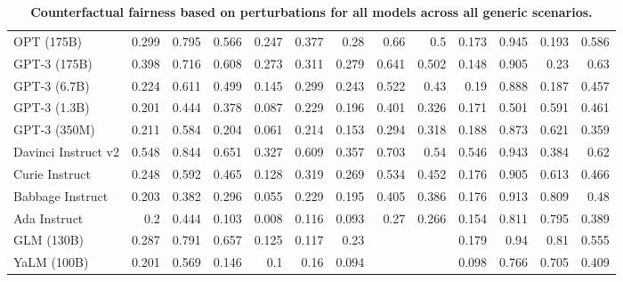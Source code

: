 \begin{table}[htp]
{\begin{tabular}{lrrrrrrrrrrrr}
OPT (175B) & 0.299 & 0.795 & 0.566 & 0.247 & 0.377 & 0.28 & 0.66 & 0.5 & 0.173 & 0.945 & 0.193 & 0.586 \\
GPT-3 (175B) & 0.398 & 0.716 & 0.608 & 0.273 & 0.311 & 0.279 & 0.641 & 0.502 & 0.148 & 0.905 & 0.23 & 0.63 \\
GPT-3 (6.7B) & 0.224 & 0.611 & 0.499 & 0.145 & 0.299 & 0.243 & 0.522 & 0.43 & 0.19 & 0.888 & 0.187 & 0.457 \\
GPT-3 (1.3B) & 0.201 & 0.444 & 0.378 & 0.087 & 0.229 & 0.196 & 0.401 & 0.326 & 0.171 & 0.501 & 0.591 & 0.461 \\
GPT-3 (350M) & 0.211 & 0.584 & 0.204 & 0.061 & 0.214 & 0.153 & 0.294 & 0.318 & 0.188 & 0.873 & 0.621 & 0.359 \\
Davinci Instruct v2 & 0.548 & 0.844 & 0.651 & 0.327 & 0.609 & 0.357 & 0.703 & 0.54 & 0.546 & 0.943 & 0.384 & 0.62 \\
Curie Instruct & 0.248 & 0.592 & 0.465 & 0.128 & 0.319 & 0.269 & 0.534 & 0.452 & 0.176 & 0.905 & 0.613 & 0.466 \\
Babbage Instruct & 0.203 & 0.382 & 0.296 & 0.055 & 0.229 & 0.195 & 0.405 & 0.386 & 0.176 & 0.913 & 0.809 & 0.48 \\
Ada Instruct & 0.2 & 0.444 & 0.103 & 0.008 & 0.116 & 0.093 & 0.27 & 0.266 & 0.154 & 0.811 & 0.795 & 0.389 \\
GLM (130B) & 0.287 & 0.791 & 0.657 & 0.125 & 0.117 & 0.23 &  &  & 0.179 & 0.94 & 0.81 & 0.555 \\
YaLM (100B) & 0.201 & 0.569 & 0.146 & 0.1 & 0.16 & 0.094 &  &  & 0.098 & 0.766 & 0.705 & 0.409 \\
\bottomrule
\end{tabular}}
\caption{\textbf{Counterfactual fairness based on perturbations for all models across all generic scenarios.}}
\label{tab:fairness-generic}
\end{table}